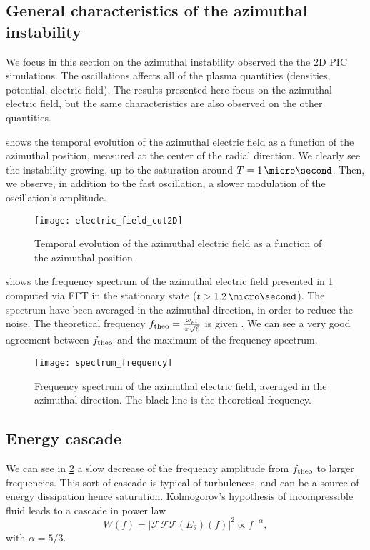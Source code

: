   \subsection{General characteristics of the azimuthal instability }
  
  We focus in this section on the azimuthal instability observed the the \ac{2D} \ac{PIC} simulations.
  The oscillations affects all of the plasma quantities (densities, potential, electric field).
  The results presented here focus on the azimuthal electric field, but the same characteristics are also observed on the other quantities.
  
   shows the temporal evolution of the azimuthal electric field as a function of the azimuthal position, measured at the center of the radial direction.
  We clearly see the instability growing, up to the saturation around $T=1\,\micro\second$.
  Then, we observe, in addition to the fast oscillation, a slower modulation of the oscillation's amplitude. 
  \begin{figure}[hbt]
    \centering
    \texttt{[image: electric\_field\_cut2D]}
    \caption{Temporal evolution of the azimuthal electric field as a function of the azimuthal position.}
    \label{fig-2DcutEx}
  \end{figure}

   shows the frequency spectrum of the azimuthal electric field presented in \cref{fig-2DcutEx} computed via \ac{FFT} in the stationary state ($t > 1.2\,\micro\second$).
  The spectrum have been averaged in the azimuthal direction, in order to reduce the noise.
  The theoretical frequency $f_{\rm theo} = \frac{\omega_{pi}}{\pi \sqrt{6} }$ is given \citep{croes2018}. 
  We can see a very good agreement between $f_{\rm theo}$ and the maximum of the frequency spectrum.
  \begin{figure}[hbt]
    \centering
    \texttt{[image: spectrum\_frequency]}
    \caption{Frequency spectrum of the azimuthal electric field, averaged in the azimuthal direction. The black line is the theoretical frequency.}
    \label{fig-FFT_ex}
  \end{figure}
  
  \subsection{Energy cascade} \label{subsec-turbul}
  
  We can see in \cref{fig-FFT_ex} a slow decrease of the frequency amplitude from $f_{\rm theo}$ to larger frequencies.
  This sort of cascade is typical of turbulences, and can be a source of energy dissipation hence saturation.
  Kolmogorov's hypothesis of incompressible fluid leads to a cascade in power law \[ W(f) = | \mathcal{FFT}(E_{\theta})(f) |^2 \propto f ^ {- \alpha}, \]
  with $\alpha = 5/3$.
  
